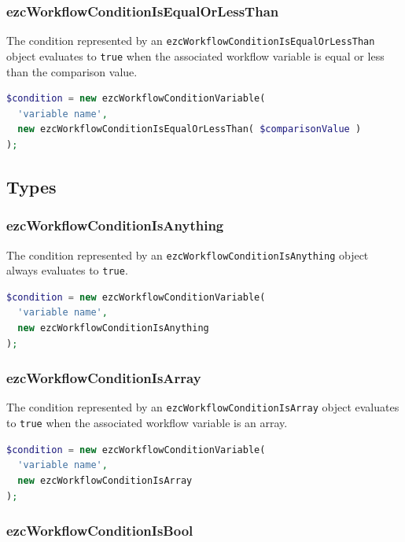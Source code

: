 \subsubsection{ezcWorkflowConditionIsEqualOrLessThan}

The condition represented by an \texttt{ezcWorkflowConditionIsEqualOrLessThan}
object evaluates to \texttt{true} when the associated workflow variable is
equal or less than the comparison value.

\begin{lstlisting}[language=PHP]
$condition = new ezcWorkflowConditionVariable(
  'variable name',
  new ezcWorkflowConditionIsEqualOrLessThan( $comparisonValue )
);
\end{lstlisting}

\subsection{Types}

\subsubsection{ezcWorkflowConditionIsAnything}

The condition represented by an \texttt{ezcWorkflowConditionIsAnything} object
always evaluates to \texttt{true}.

\begin{lstlisting}[language=PHP]
$condition = new ezcWorkflowConditionVariable(
  'variable name',
  new ezcWorkflowConditionIsAnything
);
\end{lstlisting}

\subsubsection{ezcWorkflowConditionIsArray}

The condition represented by an \texttt{ezcWorkflowConditionIsArray}
object evaluates to \texttt{true} when the associated workflow variable is
an array.

\begin{lstlisting}[language=PHP]
$condition = new ezcWorkflowConditionVariable(
  'variable name',
  new ezcWorkflowConditionIsArray
);
\end{lstlisting}

\subsubsection{ezcWorkflowConditionIsBool}

